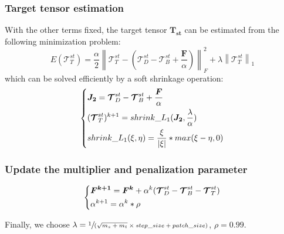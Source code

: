\documentclass[journal]{IEEEtran}
\begin{document}
\subsubsection{Target tensor estimation}
With the other terms fixed, the target tensor $\bm{T_{st}}$ can be estimated from the following minimization problem:
\begin{equation}
  E(\bm{\mathcal T}_T^{st})=\frac{\alpha}{2} \left \|\bm{\mathcal T}_T^{st}-(\bm{\mathcal T}_D^{st}-\bm{\mathcal T}_B^{st}+\frac{\bm{F}}{\alpha}) \right \|_F^2 + \lambda \left \|\bm{\mathcal T}_T^{st} \right \| _1
  \label{optimization2}
\end{equation}
which can be solved efficiently by a soft shrinkage operation:
\begin{equation}
  \begin{dcases}
    \bm{J_2}=\bm{\mathcal T}_D^{st}-\bm{\mathcal T}_B^{st}+\frac{\bm{F}}{\alpha}\\
    (\bm{\mathcal T}_T^{st})^{k+1}=shrink\_L_{1}(\bm{J_2},\frac{\lambda}{\alpha})\\
    shrink\_L_{1}(\xi,\eta)=\frac{\xi}{|\xi|} \ast max(\xi-\eta,0)
  \end{dcases}
\end{equation}

\subsubsection{Update the multiplier and penalization parameter}
\begin{equation}
  \begin{dcases}
    \bm{F^{k+1}}=\bm{F^{k}}+\alpha^{k}(\bm{\mathcal T}_D^{st}-\bm{\mathcal T}_B^{st}-\bm{\mathcal T}_T^{st})\\
    \alpha^{k+1}=\alpha^{k} \ast \rho
  \end{dcases}
\end{equation}

Finally, we choose $\lambda=\sfrac{1}{(\sqrt{m_s+m_t}\times step\_size + patch\_size)}$, $\rho=0.99$.
\end{document}
